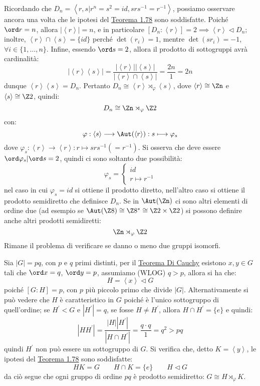 \documentclass[11pt]{scrartcl}
\begin{document}
\begin{example}
    Ricordando che $D_n = \left<r,s | r^n = s^2 = id, srs^{-1} = r^{-1}\right>$, possiamo osservare ancora una volta che le ipotesi del \hyperref[t:1.78]{Teorema 1.78} sono soddisfatte. Poiché $\ord r = n$, allora $|\left<r\right>| = n$, 
    e in particolare $[D_n : \left<r\right>] = 2 \implies \left<r\right> \triangleleft D_n$; inoltre, $\left<r\right> \cap \left<s\right> = \{id\}$ perché $\det(r_i) = 1$, mentre $\det(sr_i) = -1$, $\forall i \in \{1,\ldots,n\}$. Infine, essendo $\ord s = 2$, allora il prodotto di sottogruppi avrà cardinalità:
        \[ |\left<r\right>\left<s\right>| = \frac{|\left<r\right>||\left<s\right>|}{|\left<r\right> \cap \left<s\right>|} = \frac{2n}{1} = 2n
            \]
    dunque $\left<r\right>\left<s\right> = D_n$. Pertanto $D_n \cong \left<r\right> \rtimes_{\varphi} \left<s\right>$, dove $\left<r\right> \cong \Zn$ e $\left<s\right> \cong \Z2$, quindi:
        \[ D_n \cong \Zn \rtimes_{\varphi} \Z2
            \]
    con:
        \[ \varphi : \left<s\right> \longrightarrow \Aut(\left<r\right>) : s \longmapsto \varphi_s
            \]
    dove $\varphi_s : \left<r\right> \longrightarrow \left<r\right> : r \longmapsto srs^{-1} (= r^{-1})$. Si osserva che deve essere $\ord \varphi_s | \ord s = 2$, quindi ci sono soltanto due possibilità:
        \[ \varphi_s = \begin{cases}
            id \\
            r \longmapsto r^{-1}
            \end{cases}
        \]
    nel caso in cui $\varphi_s = id$ si ottiene il prodotto diretto, nell'altro caso si ottiene il prodotto semidiretto che definisce $D_n$. Se in $\Aut(\Zn)$ ci sono altri elementi di ordine due
     (ad esempio se $\Aut(\Z8) \cong \Z8^* \cong \Z2 \times \Z2$) si possono definire anche altri prodotti semidiretti:
    \[ \Zn \rtimes_{\varphi} \Z2
        \]
    Rimane il problema di verificare se danno o meno due gruppi isomorfi.
\end{example}

\begin{example}
    Sia $|G| = pq$, con $p$ e $q$ primi distinti, per il \hyperref[p:Cauchy]{Teorema Di Cauchy} esistono $x,y \in G$ tali che $\ord x = q$, $\ord y = p$, assumiamo (WLOG) $q>p$, allora si ha che:
        \[ H = \left<x\right> \triangleleft G
            \]
    poiché $[G : H] = p$, con $p$ più piccolo primo che divide $|G|$. Alternativamente si può vedere che $H$ è caratteristico in $G$ poiché è l'unico sottogruppo di quell'ordine;
    se $H^{\prime} < G$ e $|H^{\prime}| = q$, se fosse $H \ne H^{\prime}$, allora $H \cap H^{\prime} = \{e\}$ e quindi:
    \[ |HH^{\prime}| = \frac{|H||H^{\prime}|}{|H \cap H^{\prime}|} = \frac{q \cdot q}{1} = q^2 > pq
        \]
    quindi $H^{\prime}$ non può essere un sottogruppo di $G$. Si verifica che, detto $K = \left<y\right>$, le ipotesi del \hyperref[t:1.78]{Teorema 1.78} sono soddisfatte:
        \[ HK = G \qquad H \cap K = \{e\} \qquad H \triangleleft G
            \]
da ciò segue che ogni gruppo di ordine $pq$ è prodotto semidiretto: $G \cong H \rtimes_{\varphi} K$.
\end{example}
\end{document}
